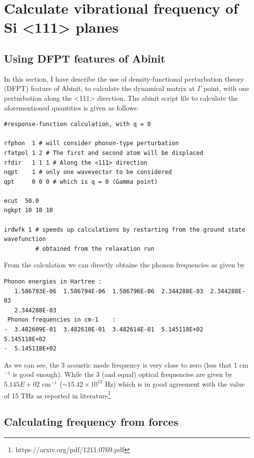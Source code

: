 \documentclass[12pt]{article} %
\begin{document}
\section{Calculate vibrational frequency of Si <111> planes}

\subsection{Using DFPT features of Abinit}
In this section, I have describe the use of density-functional perturbation theory (DFPT) feature of Abinit, to calculate the dynamical matrix at $\Gamma$ point, with one perturbation along the <111> direction. The abinit script file to calculate the aforementioned quantities is given as follows:
\begin{verbatim}
#response-function calculation, with q = 0

rfphon  1 # will consider phonon-type perturbation
rfatpol 1 2 # The first and second atom will be displaced
rfdir   1 1 1 # Along the <111> direction
nqpt    1 # only one wavevector to be considered
qpt     0 0 0 # which is q = 0 (Gamma point)

ecut  50.0
ngkpt 10 10 10

irdwfk 1 # speeds up calculations by restarting from the ground state wavefunction 
         # obtained from the relaxation run
\end{verbatim}

From the calculation we can directly obtaine the phonon frequencies as given by
\begin{verbatim}
Phonon energies in Hartree :
   1.586793E-06  1.586794E-06  1.586796E-06  2.344288E-03  2.344288E-03
   2.344288E-03
 Phonon frequencies in cm-1    :
-  3.482609E-01  3.482610E-01  3.482614E-01  5.145118E+02  5.145118E+02
-  5.145118E+02
\end{verbatim}
As we can see, the 3 acoustic mode frequency is very close to zero (less that 1 cm$^{-1}$ is good enough). While the 3 (and equal) optical frequencies are given by $5.145E+02$ cm$^{-1}$  ($\sim 15.42\times10^{12}$ Hz) which is in good agreement with the value of 15 THz as reported in literature\footnote{https://arxiv.org/pdf/1211.0769.pdf}

\subsection{Calculating frequency from forces}
\end{document}
